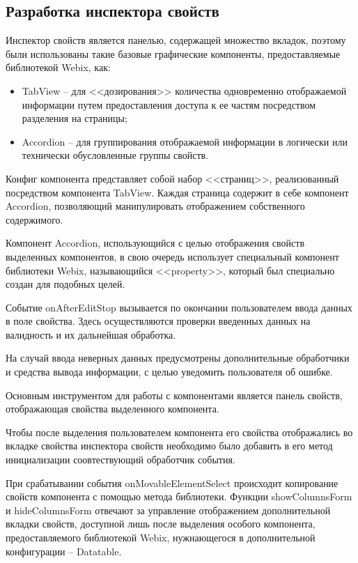 \subsection{Разработка инспектора свойств}
\label{sec:development:property_inspector}

Инспектор свойств является панелью, содержащей множество вкладок, поэтому были использованы такие базовые графические компоненты, предоставляемые библиотекой Webix, как:

\begin{itemize}
    \item TabView -- для <<дозирования>> количества одновременно отображаемой информации путем предоставления доступа к ее частям посредством разделения на страницы;
    \item Accordion -- для группирования отображаемой информации в логически или технически обусловленные группы свойств.
\end{itemize}

Конфиг компонента представляет собой набор <<страниц>>, реализованный посредством компонента TabView. Каждая страница содержит в себе компонент Accordion, позволяющий манипулировать отображением собственного содержимого.

Компонент Accordion, использующийся с целью отображения свойств выделенных компонентов, в свою очередь использует специальный компонент библиотеки Webix, называющийся <<property>>, который был специально создан для подобных целей.

Событие onAfterEditStop вызывается по окончании пользователем ввода данных в поле свойства. Здесь осуществляются проверки введенных данных на валидность и их дальнейшая обработка.

На случай ввода неверных данных предусмотрены дополнительные обработчики и средства вывода информации, с целью уведомить пользователя об ошибке.

Основным инструментом для работы с компонентами является панель свойств, отображающая свойства выделенного компонента.

Чтобы после выделения пользователем компонента его свойства отображались во вкладке свойства инспектора свойств необходимо было добавить в его метод инициализации соовтествующий обработчик события.

При срабатывании события onMovableElementSelect происходит копирование свойств компонента с помощью метода библиотеки. Функции showColumnsForm и hideColumnsForm отвечают за управление отображением дополнительной вкладки свойств, доступной лишь после выделения особого компонента, предоставляемого библиотекой Webix, нужнающегося в дополнительной конфигурации -- Datatable.

